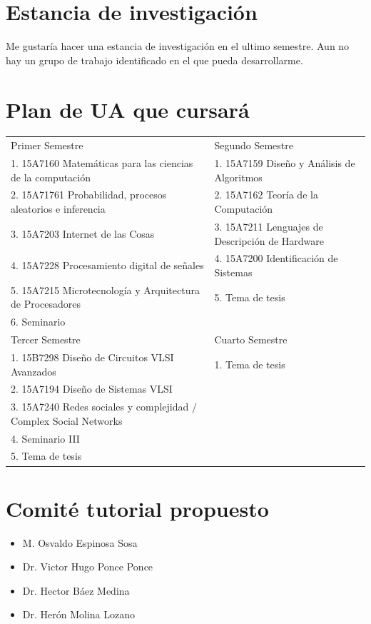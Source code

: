 \documentclass[runningheads,a4paper]{llncs}
\begin{document}
\section{Estancia de investigación}
Me gustaría hacer una estancia de investigación en el ultimo semestre. Aun no hay un grupo de trabajo identificado en el que pueda desarrollarme. \\ 


\break
\section{Plan de UA que cursará}
\begin{table}
\begin{center}
 \begin{tabular}{|l|l|}
Primer Semestre & Segundo Semestre\\
1. 15A7160 Matemáticas para las ciencias de la computación & 1. 15A7159 Diseño y Análisis de Algoritmos \\
2. 15A71761 Probabilidad, procesos aleatorios e inferencia & 2. 15A7162 Teoría de la Computación \\
3. 15A7203 Internet de las Cosas & 3. 15A7211 Lenguajes de Descripción de Hardware \\ 
4. 15A7228 Procesamiento digital de señales & 4. 15A7200 Identificación de Sistemas \\ 
5. 15A7215 Microtecnología y Arquitectura de Procesadores & 5. Tema de tesis\\ 
6. Seminario  \\
\hline\noalign{\smallskip}
Tercer Semestre & Cuarto Semestre\\

1. 15B7298 Diseño de Circuitos VLSI Avanzados & 1. Tema de tesis\\
2. 15A7194 Diseño de Sistemas VLSI & \\
3. 15A7240 Redes sociales y complejidad / Complex Social Networks & \\
4. Seminario III& \\
5. Tema de tesis & \\
\hline
\end{tabular}
\end{center}
\end{table}

\section{Comité tutorial propuesto}
\begin{itemize}
\item M. Osvaldo Espinosa Sosa
\item Dr. Victor Hugo Ponce Ponce
\item Dr. Hector Báez Medina
\item Dr. Herón Molina Lozano
 \end{itemize}
\end{document}
